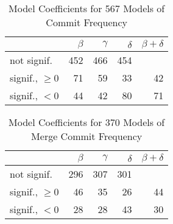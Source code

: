 
\begin{table}[t] \centering
\small
  \caption{Model Coefficients for 567 Models of Commit Frequency}
  \label{Table:rddmodels_freq}
\begin{tabular}{ l  r r r r }        
\hline 

 & $\beta$ & $\gamma$ & $\delta$ & $\beta + \delta$ \\ 
 \hline 
 \hline
not signif. & 452 & 466 & 454 & \\
\hline
signif., $\ge 0$ & 71 & 59 & 33 & 42 \\
\hline
signif., $<0$ & 44 & 42 & 80 & 71 \\
\hline
\end{tabular}
\end{table}

\begin{table}[t] \centering
\small
  \caption{Model Coefficients for 370 Models of Merge Commit Frequency}
  \label{Table:rddmodels_merge_freq}
\begin{tabular}{ l  r r r r }        
\hline 

 & $\beta$ & $\gamma$ & $\delta$ & $\beta + \delta$ \\ 
 \hline 
 \hline
not signif. & 296 & 307 & 301 & \\
\hline
signif., $\ge 0$ & 46 & 35 & 26 & 44 \\
\hline
signif., $<0$ & 28 & 28 & 43 & 30 \\
\hline
\end{tabular}
\end{table}